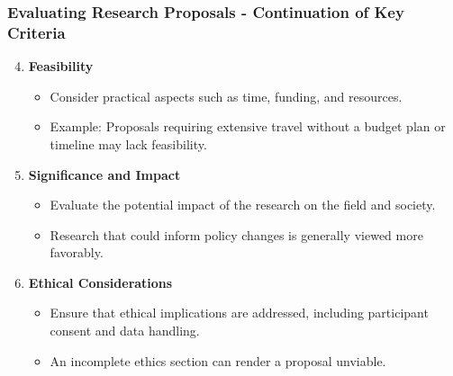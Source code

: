 \documentclass[aspectratio=169]{beamer}
\begin{document}
\begin{frame}[fragile]
    \frametitle{Evaluating Research Proposals - Continuation of Key Criteria}
    \begin{enumerate}
        \setcounter{enumi}{3} %
        \item \textbf{Feasibility}
            \begin{itemize}
                \item Consider practical aspects such as time, funding, and resources.
                \item Example: Proposals requiring extensive travel without a budget plan or timeline may lack feasibility.
            \end{itemize}
        
        \item \textbf{Significance and Impact}
            \begin{itemize}
                \item Evaluate the potential impact of the research on the field and society.
                \item Research that could inform policy changes is generally viewed more favorably.
            \end{itemize}
        
        \item \textbf{Ethical Considerations}
            \begin{itemize}
                \item Ensure that ethical implications are addressed, including participant consent and data handling.
                \item An incomplete ethics section can render a proposal unviable.
            \end{itemize}
    \end{enumerate}
\end{frame}
\end{document}
